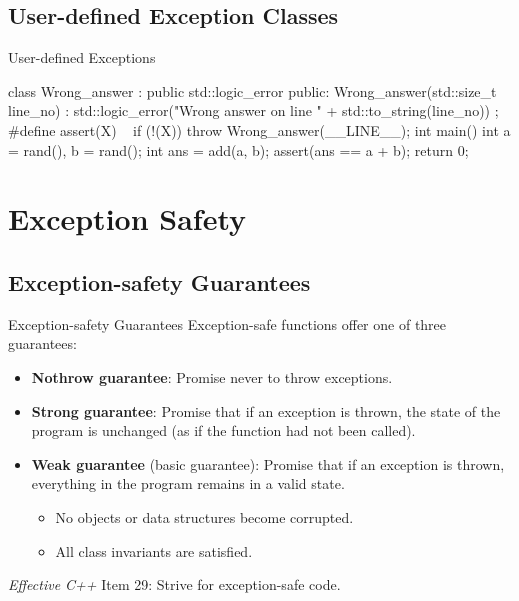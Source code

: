 \documentclass{beamer}
\begin{document}
\subsection{User-defined Exception Classes}

\begin{frame}[fragile]{User-defined Exceptions}
  \begin{cpp}
class Wrong_answer : public std::logic_error {
 public:
  Wrong_answer(std::size_t line_no)
      : std::logic_error("Wrong answer on line "
          + std::to_string(line_no)) {}
};
#define assert(X)                          \
  { if (!(X)) throw Wrong_answer(__LINE__); }
int main() {
  int a = rand(), b = rand();
  int ans = add(a, b);
  assert(ans == a + b);
  return 0;
}
  \end{cpp}
\end{frame}

\section{Exception Safety}

\subsection{Exception-safety Guarantees}

\begin{frame}{Exception-safety Guarantees}
  Exception-safe functions offer one of three guarantees:
  \begin{itemize}
    \item \textbf{Nothrow guarantee}: Promise never to throw exceptions.
    \item \textbf{Strong guarantee}: Promise that if an exception is thrown, the state of the program is unchanged (as if the function had not been called).
    \item \textbf{Weak guarantee} (basic guarantee): Promise that if an exception is thrown, everything in the program remains in a valid state.
    \begin{itemize}
      \item No objects or data structures become corrupted.
      \item All class invariants are satisfied.
    \end{itemize}
  \end{itemize}
  \textit{Effective C++} Item 29: Strive for exception-safe code.
\end{frame}
\end{document}
